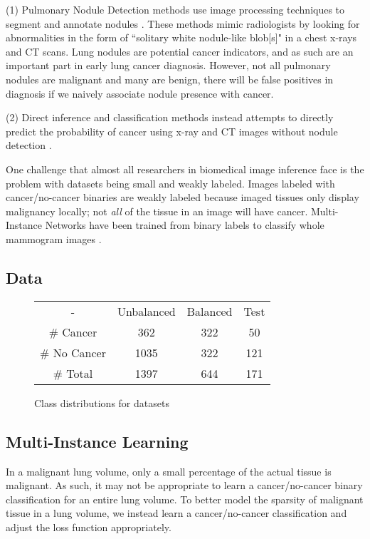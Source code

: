\documentclass[twocolumn,10pt]{article}
\newcommand{\red}[1]{{\color{red}#1}}
\begin{document}
(1) Pulmonary Nodule Detection methods use 
image processing techniques to segment and annotate nodules
\cite{FeatureBasedLungNoduleDetection_2017, 
     LungNoduleDetectionWeaklyLabeled_2016, U-net_2015}. These methods
mimic radiologists by looking for abnormalities in the form of
``solitary white nodule-like blob[s]" in a chest x-rays and CT scans.
Lung nodules are potential cancer indicators, and as such are an important part 
in early lung cancer diagnosis. However, not all pulmonary nodules are malignant
and many are benign, there will be false positives in diagnosis if we naively
associate nodule presence with cancer. 

(2) Direct inference and classification methods
instead attempts to directly predict the probability of cancer using x-ray and
CT images without nodule detection
\cite{Kuruvilla_2013, classificationOfNodules_2016}. 

One challenge that almost all researchers in biomedical image inference face is 
the problem with datasets being small and weakly labeled. Images labeled with
cancer/no-cancer binaries are weakly labeled because imaged tissues only display
malignancy locally; not \textit{all} of the tissue in an image will have cancer.
Multi-Instance Networks have been trained from binary labels to classify whole
mammogram images \cite{Maron:1998:FML:302528.302753}.

\subsection{Data}
\begin{figure}[h!]
  \label{fig:data}
  \begin{center}
	\begin{tabular}{ | c || c |c| c| }
	\hline
	 - & Unbalanced & Balanced & Test\\
	\hhline{|=||=|=|=|}
	\# Cancer & 362 & 322 & 50 \\
	\hline
	\# No Cancer & 1035 & 322 & 121\\
	\hline
	\# Total & 1397 & 644 & 171\\
	\hline
	\end{tabular}  
\end{center}
	\caption{Class distributions for datasets}
\end{figure}


\subsection{Multi-Instance Learning}
In a malignant lung volume, only a small percentage of the actual tissue is
 malignant.  As such, it may not be appropriate to learn a cancer/no-cancer
 binary classification for an entire lung volume. To better model the
 sparsity of malignant tissue in a lung volume, we instead learn a cancer/no-cancer
 classification and adjust the loss function appropriately.
\end{document}
